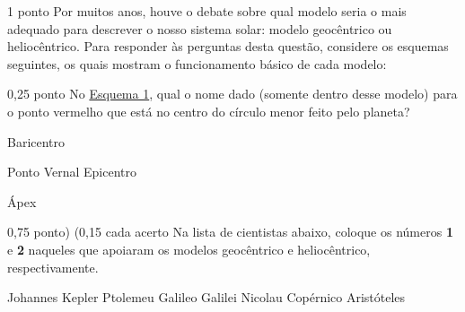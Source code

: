 \documentclass{../lista}
\begin{document}
	\begin{questao}{1 ponto}
		Por muitos anos, houve o debate sobre qual modelo seria o mais adequado para descrever o nosso sistema solar: modelo geocêntrico ou heliocêntrico. Para responder às perguntas desta questão, considere os esquemas seguintes, os quais mostram o funcionamento básico de cada modelo:
		
		

		\begin{pergunta}{0,25 ponto}
			No \hyperref[img:geocentrico]{Esquema 1}, qual o nome dado (somente dentro desse modelo) para o ponto vermelho que está no centro do círculo menor feito pelo planeta?

			\begin{multicols}{2} \begin{alternativas}
				\item Baricentro
				\item Ponto Vernal
				\alternativaMarcada Epicentro
				\item Ápex
			\end{alternativas} \end{multicols}
		\end{pergunta}

		\begin{pergunta}{0,75 ponto) (0,15 cada acerto}
			Na lista de cientistas abaixo, coloque os números \textbf{1} e \textbf{2} naqueles que apoiaram os modelos geocêntrico e heliocêntrico, respectivamente.

			\begin{alternativas}
				\alternativaMarcada[$\red{2}$] Johannes Kepler
				\alternativaMarcada[$\red{1}$] Ptolemeu
				\alternativaMarcada[$\red{2}$] Galileo Galilei
				\alternativaMarcada[$\red{2}$] Nicolau Copérnico
				\alternativaMarcada[$\red{1}$] Aristóteles
			\end{alternativas}
		\end{pergunta}
	\end{questao}
	
	\encerramento
\end{document}
